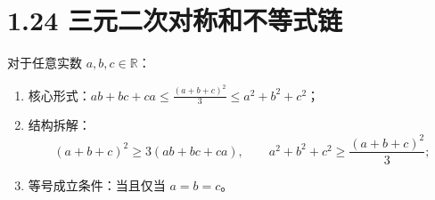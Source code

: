 \documentclass{article}
\begin{document}
\section*{1.24 三元二次对称和不等式链}
对于任意实数 \( a,b,c \in \mathbb{R} \)：
\begin{enumerate}
    \item 核心形式：\( ab+bc+ca \leq \frac{(a+b+c)^2}{3} \leq a^2+b^2+c^2 \)；
    \item 结构拆解：
    \[
    (a+b+c)^2 \geq 3(ab+bc+ca),\qquad a^2+b^2+c^2 \geq \frac{(a+b+c)^2}{3};
    \]
    \item 等号成立条件：当且仅当 \( a=b=c \)。
\end{enumerate}
\end{document}
